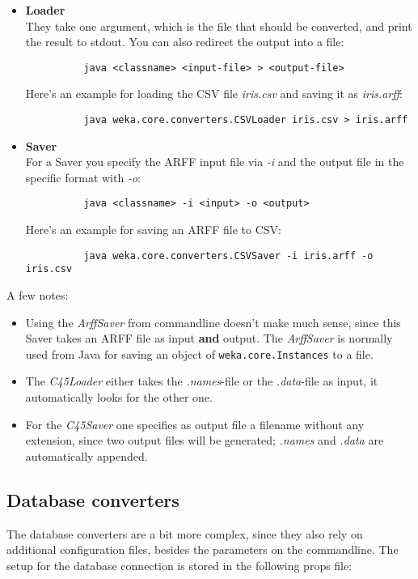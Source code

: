 \begin{itemize}
	\item \textbf{Loader} \\
		They take one argument, which is the file that should be converted, and print the result to stdout. You can also redirect the output into a file:
		\begin{verbatim}
 		  java <classname> <input-file> > <output-file>
		\end{verbatim}
		\noindent Here's an example for loading the CSV file \textit{iris.csv} and saving it as \textit{iris.arff}:
		\begin{verbatim}
 		  java weka.core.converters.CSVLoader iris.csv > iris.arff
		\end{verbatim}

	\item \textbf{Saver} \\
		For a Saver you specify the ARFF input file via \textit{-i} and the output file in the specific format with \textit{-o}:
		\begin{verbatim}
		  java <classname> -i <input> -o <output>
		\end{verbatim}
		\noindent Here's an example for saving an ARFF file to CSV:
		\begin{verbatim}
 		  java weka.core.converters.CSVSaver -i iris.arff -o iris.csv
		\end{verbatim}
\end{itemize}

A few notes:

\begin{itemize}
	\item Using the \textit{ArffSaver} from commandline doesn't make much sense, since this Saver takes an ARFF file as input \textbf{and} output. The \textit{ArffSaver} is normally used from Java for saving an object of \texttt{weka.core.Instances} to a file.
	\item The \textit{C45Loader} either takes the \textit{.names}-file or the \textit{.data}-file as input, it automatically looks for the other one.
	\item For the \textit{C45Saver} one specifies as output file a filename without any extension, since two output files will be generated; \textit{.names} and \textit{.data} are automatically appended.
\end{itemize}


\subsection{Database converters}
The database converters are a bit more complex, since they also rely on additional configuration files, besides the parameters on the commandline. The setup for the database connection is stored in the following props file:

